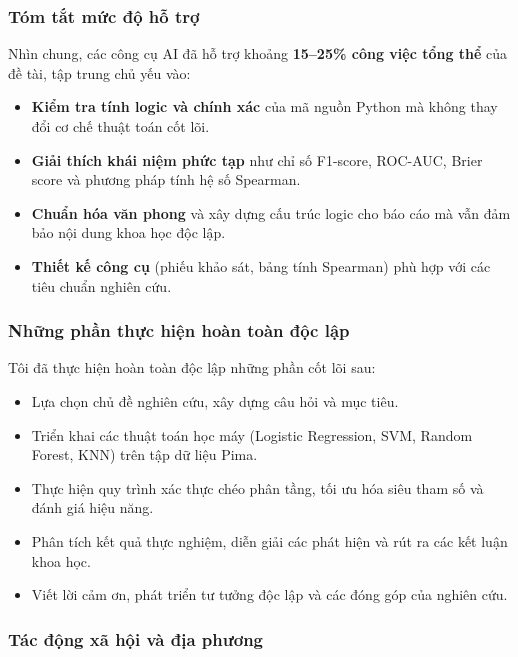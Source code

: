 \documentclass[14pt,a4paper]{extreport}
\begin{document}
\subsubsection*{Tóm tắt mức độ hỗ trợ}

Nhìn chung, các công cụ AI đã hỗ trợ khoảng \textbf{15--25\% công việc tổng thể} của đề tài, tập trung chủ yếu vào:
\begin{itemize}
  \item \textbf{Kiểm tra tính logic và chính xác} của mã nguồn Python mà không thay đổi cơ chế thuật toán cốt lõi.
  \item \textbf{Giải thích khái niệm phức tạp} như chỉ số F1-score, ROC-AUC, Brier score và phương pháp tính hệ số Spearman.
  \item \textbf{Chuẩn hóa văn phong} và xây dựng cấu trúc logic cho báo cáo mà vẫn đảm bảo nội dung khoa học độc lập.
  \item \textbf{Thiết kế công cụ} (phiếu khảo sát, bảng tính Spearman) phù hợp với các tiêu chuẩn nghiên cứu.
\end{itemize}

\subsubsection*{Những phần thực hiện hoàn toàn độc lập}

Tôi đã thực hiện hoàn toàn độc lập những phần cốt lõi sau:
\begin{itemize}
  \item Lựa chọn chủ đề nghiên cứu, xây dựng câu hỏi và mục tiêu.
  \item Triển khai các thuật toán học máy (Logistic Regression, SVM, Random Forest, KNN) trên tập dữ liệu Pima.
  \item Thực hiện quy trình xác thực chéo phân tầng, tối ưu hóa siêu tham số và đánh giá hiệu năng.
  \item Phân tích kết quả thực nghiệm, diễn giải các phát hiện và rút ra các kết luận khoa học.
  \item Viết lời cảm ơn, phát triển tư tưởng độc lập và các đóng góp của nghiên cứu.
\end{itemize}

\subsubsection*{Tác động xã hội và địa phương}
\end{document}
